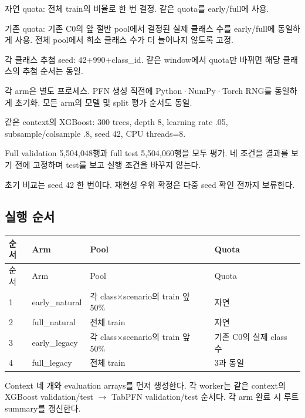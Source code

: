 \par\noindent \textbullet\enspace 자연 quota: 전체 train의 비율로 한 번 결정. 같은 quota를 early/\allowbreak{}full에 사용.


\par\noindent \textbullet\enspace 기존 quota: 기존 C0의 앞 절반 pool에서 결정된 실제 클래스 수를 early/\allowbreak{}full에 동일하게 사용. 전체 pool에서 희소 클래스 수가 더 늘어나지 않도록 고정.


\par\noindent \textbullet\enspace 각 클래스 추첨 seed: 42+\allowbreak{}990+\allowbreak{}class\_\allowbreak{}id. 같은 window에서 quota만 바뀌면 해당 클래스의 추첨 순서는 동일.


\par\noindent \textbullet\enspace 각 arm은 별도 프로세스. PFN 생성 직전에 Python·NumPy·Torch RNG를 동일하게 초기화. 모든 arm의 모델 및 split 평가 순서도 동일.


\par\noindent \textbullet\enspace 같은 context의 XGBoost: 300 trees, depth 8, learning rate .05, subsample/\allowbreak{}colsample .8, seed 42, CPU threads=\allowbreak{}8.


\par\noindent \textbullet\enspace Full validation 5,504,048행과 full test 5,504,060행을 모두 평가. 네 조건을 결과를 보기 전에 고정하며 test를 보고 실행 조건을 바꾸지 않는다.


\par\noindent \textbullet\enspace 초기 비교는 seed 42 한 번이다. 재현성 우위 확정은 다중 seed 확인 전까지 보류한다.


\subsection{실행 순서}
\begingroup
\footnotesize
\begin{longtable}{>{\raggedleft\arraybackslash}p{}>{\raggedright\arraybackslash}p{}>{\raggedright\arraybackslash}p{}>{\raggedright\arraybackslash}p{}}
\toprule
순서 & Arm & Pool & Quota \\ \midrule
\endfirsthead
순서 & Arm & Pool & Quota \\ \midrule
\endhead
{}1 & early\_\allowbreak{}natural & 각 class×scenario의 train 앞 50\% & 자연 \\
{}2 & full\_\allowbreak{}natural & 전체 train & 자연 \\
{}3 & early\_\allowbreak{}legacy & 각 class×scenario의 train 앞 50\% & 기존 C0의 실제 class 수 \\
{}4 & full\_\allowbreak{}legacy & 전체 train & 3과 동일 \\
\bottomrule
\end{longtable}
\endgroup
Context 네 개와 evaluation arrays를 먼저 생성한다. 각 worker는 같은 context의 XGBoost validation/\allowbreak{}test  \ensuremath{\rightarrow}  TabPFN validation/\allowbreak{}test 순서다. 각 arm 완료 시 루트 summary를 갱신한다.

